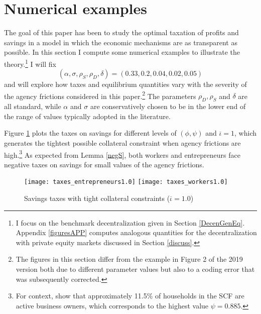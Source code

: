 \documentclass[11pt]{article}
\theoremstyle{plain}
\theoremstyle{definition} %
\begin{document}
\section{Numerical examples}\label{numerical}

The goal of this paper has been to study the optimal taxation of profits and savings in a model in which the economic mechanisms are as transparent as possible. In this section I compute some numerical examples to illustrate the theory.\footnote{I focus on the benchmark decentralization given in Section \ref{DecenGenEq}. Appendix \ref{figuresAPP} computes analogous quantities for the decentralization with private equity markets discussed in Section \ref{discuss}.} I will fix
\begin{equation} %
(\alpha, \sigma, \rho_S, \rho_D, \delta) = (0.33, 0.2, 0.04, 0.02, 0.05)
\label{standardPARAMS}
\end{equation} %
and will explore how taxes and equilibrium quantities vary with the severity of the agency frictions considered in this paper.\footnote{The figures in this section differ from the example in Figure 2 of the 2019 version both due to different parameter values but also to a coding error that was subsequently corrected.} The parameters $\rho_D, \rho_S$ and $\delta$ are all standard, while $\alpha$ and $\sigma$ are conservatively chosen to be in the lower end of the range of values typically adopted in the literature. 

Figure \ref{tax} plots the taxes on savings for different levels of $(\phi, \psi)$ and $\overline{\iota}=1$, which generates the tightest possible collateral constraint when agency frictions are high.\footnote{For context, \cite{cagetti_entrepreneurship_2006} show that approximately 11.5\% of households in the SCF are active business owners, which corresponds to the highest value $\psi = 0.885$.} As expected from Lemma \ref{negS}, both workers and entrepreneurs face negative taxes on savings for small values of the agency frictions. 

\begin{figure}[H]
\centering
\caption{Savings taxes with tight collateral constraints ($\overline{\iota}=1.0$)}
\texttt{[image: taxes\_entrepreneurs1.0]}
\texttt{[image: taxes\_workers1.0]}
\label{tax} 
\end{figure} 
\end{document}
